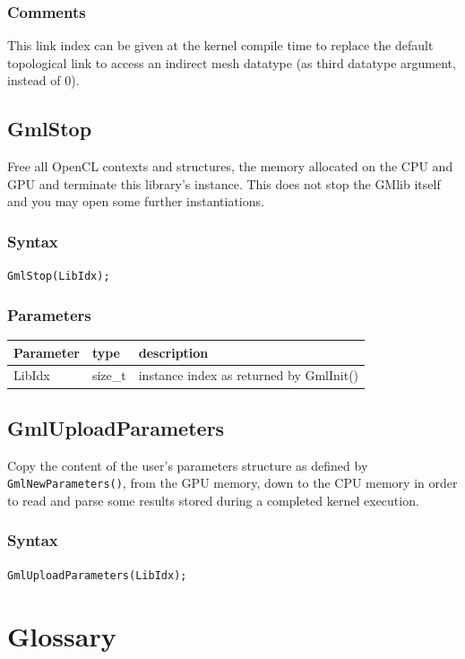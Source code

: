 \documentclass[a4paper,12pt]{article}
\begin{document}
\subsubsection*{Comments}
This link index can be given at the kernel compile time to replace the default topological link to access an indirect mesh datatype (as third datatype argument, instead of 0).


\subsection{GmlStop}
Free all OpenCL contexts and structures, the memory allocated on the CPU and GPU and terminate this library's instance. This does not stop the GMlib itself and you may open some further instantiations.

\subsubsection*{Syntax}
{\tt GmlStop(LibIdx);}

\subsubsection*{Parameters}
\begin{tabular}{|m{2cm}|m{1.5cm}|m{10.5cm}|}
\hline
Parameter  & type    & description \\
\hline
LibIdx     & size\_t & instance index as returned by GmlInit() \\
\hline
\end{tabular}


\subsection{GmlUploadParameters}
Copy the content of the user's parameters structure as defined by {\tt GmlNewParameters()}, from the GPU memory, down to the CPU memory in order to read and parse some results stored during a completed kernel execution.

\subsubsection*{Syntax}
{\tt GmlUploadParameters(LibIdx);}


%
%

\section{Glossary}
\end{document}
